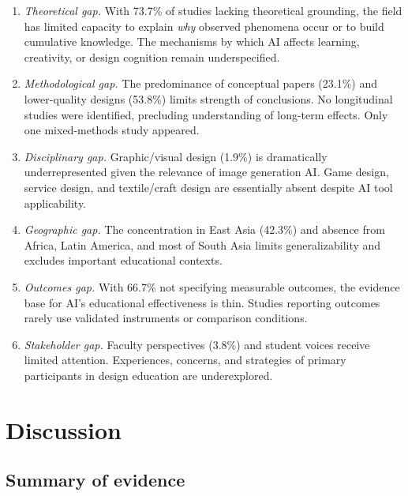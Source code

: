 \documentclass[ed]{acnsart}
\begin{document}
\begin{enumerate}
	\item 
\textit{Theoretical gap.} With 73.7\% of studies lacking theoretical grounding, the field has limited capacity to explain \textit{why} observed phenomena occur or to build cumulative knowledge. The mechanisms by which AI affects learning, creativity, or design cognition remain underspecified.

	\item 
\textit{Methodological gap.} The predominance of conceptual papers (23.1\%) and lower-quality designs (53.8\%) limits strength of conclusions. No longitudinal studies were identified, precluding understanding of long-term effects. Only one mixed-methods study appeared.

	\item 
\textit{Disciplinary gap.} Graphic/visual design (1.9\%) is dramatically underrepresented given the relevance of image generation AI. Game design, service design, and textile/craft design are essentially absent despite AI tool applicability.

	\item 
\textit{Geographic gap.} The concentration in East Asia (42.3\%) and absence from Africa, Latin America, and most of South Asia limits generalizability and excludes important educational contexts.

	\item 
\textit{Outcomes gap.} With 66.7\% not specifying measurable outcomes, the evidence base for AI's educational effectiveness is thin. Studies reporting outcomes rarely use validated instruments or comparison conditions.

	\item 
\textit{Stakeholder gap.} Faculty perspectives (3.8\%) and student voices receive limited attention. Experiences, concerns, and strategies of primary participants in design education are underexplored.
\end{enumerate}


\section{Discussion}
\label{sec:discussion}

\subsection{Summary of evidence}
\end{document}
